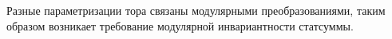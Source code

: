 \documentclass[a4paper,12pt]{article}
\theoremstyle{definition} \newtheorem{Def}{Definition}
\begin{document}
Разные параметризации тора связаны модулярными преобразованиями, таким образом возникает требование
модулярной инвариантности статсуммы.
\end{document}
